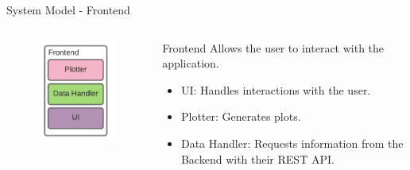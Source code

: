 \begin{frame}{System Model - Frontend}
    \begin{columns}[T]
        \begin{column}{.48\textwidth}
            \begin{figure}[H]
                \includegraphics[width=\textwidth]{images/systemmodel_frontend.pdf}
                \label{fig:frontendmodel}
            \end{figure}
        \end{column}
        \hfill
        \begin{column}{.48\textwidth}
            \begin{block}{Frontend}
                Allows the user to interact with the application.
            \end{block}
            \begin{itemize}
                \item<2-> UI:\newline{} Handles interactions with the user.
                \item<3-> Plotter:\newline{} Generates plots.
                \item<4-> Data Handler:\newline{} Requests information from the Backend with their REST API.
            \end{itemize}
        \end{column}
    \end{columns}
\end{frame}


